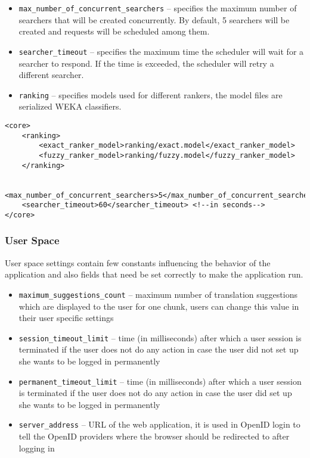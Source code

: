 \begin{itemize}
        \item \verb#max_number_of_concurrent_searchers# -- specifies the maximum number of searchers that will be created concurrently. By default, 5 searchers will be created and requests will be scheduled among them.
        \item \verb#searcher_timeout# -- specifies the maximum time the scheduler will wait for a searcher to respond. If the time is exceeded, the scheduler will retry a different searcher.
        \item \verb#ranking# -- specifies models used for different rankers, the model files are serialized WEKA classifiers.

\end{itemize}

\begin{lstlisting}
<core>
    <ranking>
        <exact_ranker_model>ranking/exact.model</exact_ranker_model>
        <fuzzy_ranker_model>ranking/fuzzy.model</fuzzy_ranker_model>
    </ranking>

    <max_number_of_concurrent_searchers>5</max_number_of_concurrent_searchers>
    <searcher_timeout>60</searcher_timeout> <!--in seconds-->
</core>

\end{lstlisting}

\subsubsection{User Space}
\label{subsec:user_scpace_settings}


User space settings contain few constants influencing the behavior of the application and also fields that need be set correctly to make the application run.

\begin{itemize} 
\item \verb#maximum_suggestions_count# -- maximum number of translation suggestions which are displayed to the user for one chunk, users can change this value in their user specific settings
\item \verb#session_timeout_limit# -- time (in milliseconds) after which a user session is terminated if the user does not do any action in case the user did not set up she wants to be logged in permanently
\item \verb#permanent_timeout_limit# -- time (in milliseconds) after which a user session is terminated if the user does not do any action in case the user did set up she wants to be logged in permanently
\item \verb#server_address# -- URL of the web application, it is used in OpenID login to tell the OpenID providers where the browser should be redirected to after logging in
\end{itemize}

